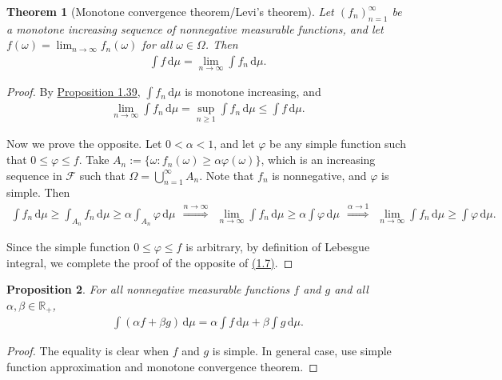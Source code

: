 \documentclass{article}
\numberwithin{equation}{section}
\renewcommand{\d}{\mathrm{d}}
\theoremstyle{plain}
\newtheorem{theorem}{Theorem}[section]
\newtheorem{proposition}[theorem]{Proposition}
\theoremstyle{definition}
\begin{document}
\begin{theorem}[Monotone convergence theorem/Levi's theorem]\label{thm:1.40} Let $(f_n)_{n=1}^\infty$ be a monotone increasing sequence of nonnegative measurable functions, and let $f(\omega)=\lim_{n\to\infty} f_n(\omega)$ for all $\omega\in\Omega$. Then
\begin{align*}
	\int f\,\d\mu = \lim_{n\to\infty}\int f_n\,\d\mu.
\end{align*}
\end{theorem}
\begin{proof}
By \hyperref[prop:1.39]{Proposition 1.39}, $\int f_n\,\d\mu$ is monotone increasing, and 
\begin{align*}
	\lim_{n\to\infty}\int f_n\,\d \mu = \sup_{n\geq 1}\int f_n\,\d \mu\leq\int f\,\d \mu.\tag{1.7}\label{eq:1.7}
\end{align*}

Now we prove the opposite. Let $0<\alpha<1$, and let $\varphi$ be any simple function such that $0\leq\varphi\leq f$. Take $A_n:=\{\omega:f_n(\omega)\geq\alpha\varphi(\omega)\}$, which is an increasing sequence in $\mathscr{F}$ such that $\Omega=\bigcup_{n=1}^\infty A_n$. Note that $f_n$ is nonnegative, and $\varphi$ is simple. Then
\begin{align*}
	\int f_n\,\d \mu\geq\int_{A_n}f_n\,\d \mu\geq\alpha\int_{A_n}\varphi\,\d \mu\ \ \overset{n\to\infty}{\Rightarrow}\ \ \lim_{n\to\infty}\int f_n\,\d \mu \geq\alpha\int\varphi\,\d \mu\ \ \overset{\alpha\to 1}{\Rightarrow}\ \ \lim_{n\to\infty}\int f_n\,\d \mu \geq\int\varphi\,\d \mu.
\end{align*}

Since the simple function $0\leq\varphi\leq f$ is arbitrary, by definition of Lebesgue integral, we complete the proof of the opposite of \hyperref[eq:1.7]{(1.7)}.
\end{proof}

\begin{proposition}\label{prop:1.41} For all nonnegative measurable functions $f$ and $g$ and all $\alpha,\beta\in\mathbb{R}_+$,
\begin{align*}
	\int(\alpha f + \beta g)\,\d \mu = \alpha\int f\,\d \mu + \beta\int g\,\d \mu.
\end{align*}
\end{proposition}
\begin{proof}
The equality is clear when $f$ and $g$ is simple. In general case, use simple function approximation and monotone convergence theorem.
\end{proof}
\end{document}

